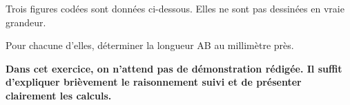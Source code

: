 \documentclass[10pt]{article}
\begin{document}
\setlength\parindent{0mm}
\pagestyle{fancy}
\thispagestyle{empty}
    
    
    




\medskip

Trois figures codées sont données ci-dessous. Elles ne sont pas dessinées en vraie grandeur. 

Pour chacune d'elles, déterminer la longueur AB au millimètre près. 

\textbf{Dans cet exercice, on n'attend pas de démonstration rédigée. Il suffit d'expliquer brièvement le raisonnement suivi et de présenter clairement les calculs.}
\end{document}
